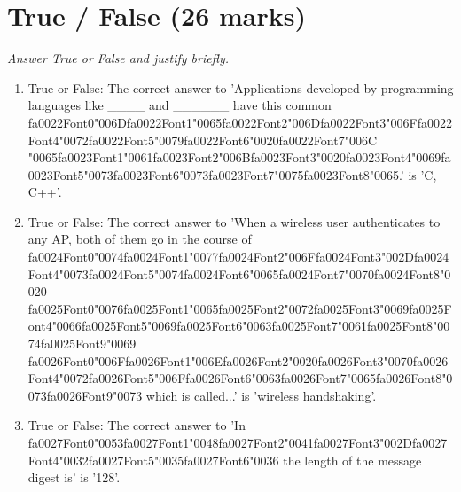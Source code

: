 \documentclass[12pt]{article}
\begin{document}
\section*{True / False (26 marks)}
\textit{Answer True or False and justify briefly.}
\begin{enumerate}[label=\arabic*.]
\item True or False: The correct answer to 'Applications developed by programming languages like \_\_\_\_ and \_\_\_\_\_\_ have this common {\csname fa0022Font0\endcsname\char"006D}{\csname fa0022Font1\endcsname\char"0065}{\csname fa0022Font2\endcsname\char"006D}{\csname fa0022Font3\endcsname\char"006F}{\csname fa0022Font4\endcsname\char"0072}{\csname fa0022Font5\endcsname\char"0079}{\csname fa0022Font6\endcsname\char"0020}{\csname fa0022Font7\endcsname\char"006C} {\char"0065}{\csname fa0023Font1\endcsname\char"0061}{\csname fa0023Font2\endcsname\char"006B}{\csname fa0023Font3\endcsname\char"0020}{\csname fa0023Font4\endcsname\char"0069}{\csname fa0023Font5\endcsname\char"0073}{\csname fa0023Font6\endcsname\char"0073}{\csname fa0023Font7\endcsname\char"0075}{\csname fa0023Font8\endcsname\char"0065}.' is 'C, C++'.
\item True or False: The correct answer to 'When a wireless user authenticates to any AP, both of them go in the course of {\csname fa0024Font0\endcsname\char"0074}{\csname fa0024Font1\endcsname\char"0077}{\csname fa0024Font2\endcsname\char"006F}{\csname fa0024Font3\endcsname\char"002D}{\csname fa0024Font4\endcsname\char"0073}{\csname fa0024Font5\endcsname\char"0074}{\csname fa0024Font6\endcsname\char"0065}{\csname fa0024Font7\endcsname\char"0070}{\csname fa0024Font8\endcsname\char"0020} {\csname fa0025Font0\endcsname\char"0076}{\csname fa0025Font1\endcsname\char"0065}{\csname fa0025Font2\endcsname\char"0072}{\csname fa0025Font3\endcsname\char"0069}{\csname fa0025Font4\endcsname\char"0066}{\csname fa0025Font5\endcsname\char"0069}{\csname fa0025Font6\endcsname\char"0063}{\csname fa0025Font7\endcsname\char"0061}{\csname fa0025Font8\endcsname\char"0074}{\csname fa0025Font9\endcsname\char"0069} {\csname fa0026Font0\endcsname\char"006F}{\csname fa0026Font1\endcsname\char"006E}{\csname fa0026Font2\endcsname\char"0020}{\csname fa0026Font3\endcsname\char"0070}{\csname fa0026Font4\endcsname\char"0072}{\csname fa0026Font5\endcsname\char"006F}{\csname fa0026Font6\endcsname\char"0063}{\csname fa0026Font7\endcsname\char"0065}{\csname fa0026Font8\endcsname\char"0073}{\csname fa0026Font9\endcsname\char"0073} which is called...' is 'wireless handshaking'.
\item True or False: The correct answer to 'In {\csname fa0027Font0\endcsname\char"0053}{\csname fa0027Font1\endcsname\char"0048}{\csname fa0027Font2\endcsname\char"0041}{\csname fa0027Font3\endcsname\char"002D}{\csname fa0027Font4\endcsname\char"0032}{\csname fa0027Font5\endcsname\char"0035}{\csname fa0027Font6\endcsname\char"0036} the length of the message digest is' is '128'.

\end{enumerate}
\end{document}
